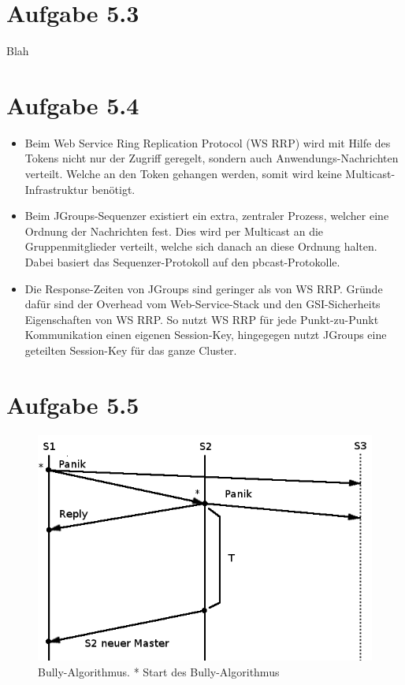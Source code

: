 \documentclass[german,12pt,a4paper]{article}
\begin{document}
\section*{Aufgabe 5.3}

Blah

\section*{Aufgabe 5.4}

\begin{itemize}

	\item Beim Web Service Ring Replication Protocol (WS RRP) wird mit Hilfe des Tokens nicht nur
		der Zugriff geregelt, sondern auch Anwendungs-Nachrichten verteilt. Welche an den Token gehangen
		werden, somit wird keine Multicast-Infrastruktur benötigt.

	\item Beim JGroups-Sequenzer existiert ein extra, zentraler Prozess, welcher eine Ordnung der
		Nachrichten fest. Dies wird per Multicast an die Gruppenmitglieder verteilt, welche sich
		danach an diese Ordnung halten. Dabei basiert das Sequenzer-Protokoll auf den
		pbcast-Protokolle.

	\item Die Response-Zeiten von JGroups sind geringer als von WS RRP. Gründe dafür sind der
		Overhead vom Web-Service-Stack und den GSI-Sicherheits Eigenschaften von WS RRP. So nutzt WS
		RRP für jede Punkt-zu-Punkt Kommunikation einen eigenen Session-Key, hingegegen nutzt
		JGroups eine geteilten Session-Key für das ganze Cluster.

\end{itemize}

\section*{Aufgabe 5.5}

\begin{figure}[h!]
  \centering
  \includegraphics[width=1\textwidth]{bully1.png}
  \caption{Bully-Algorithmus. * Start des Bully-Algorithmus}
\end{figure}
\end{document}
